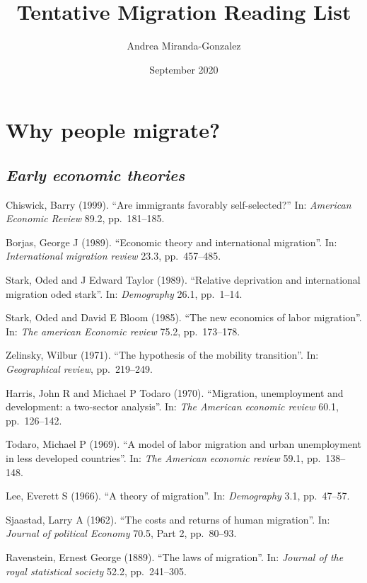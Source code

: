 \documentclass[
  12pt,
]{article}
\title{Tentative Migration Reading List}
\author{Andrea Miranda-Gonzalez}
\date{September 2020}
\begin{document}
\maketitle

{
\setcounter{tocdepth}{2}
\tableofcontents
}
\hypertarget{why-people-migrate}{%
\section{\texorpdfstring{\textbf{Why people
migrate?}}{Why people migrate?}}\label{why-people-migrate}}

\hypertarget{early-economic-theories}{%
\subsection{\texorpdfstring{\emph{Early economic
theories}}{Early economic theories}}\label{early-economic-theories}}

Chiswick, Barry (1999). ``Are immigrants favorably self-selected?'' In:
\emph{American Economic Review} 89.2, pp.~181--185.

Borjas, George J (1989). ``Economic theory and international
migration''. In: \emph{International migration review} 23.3,
pp.~457--485.

Stark, Oded and J Edward Taylor (1989). ``Relative deprivation and
international migration oded stark''. In: \emph{Demography} 26.1,
pp.~1--14.

Stark, Oded and David E Bloom (1985). ``The new economics of labor
migration''. In: \emph{The american Economic review} 75.2, pp.~173--178.

Zelinsky, Wilbur (1971). ``The hypothesis of the mobility transition''.
In: \emph{Geographical review}, pp.~219--249.

Harris, John R and Michael P Todaro (1970). ``Migration, unemployment
and development: a two-sector analysis''. In:
\emph{The American economic review} 60.1, pp.~126--142.

Todaro, Michael P (1969). ``A model of labor migration and urban
unemployment in less developed countries''. In:
\emph{The American economic review} 59.1, pp.~138--148.

Lee, Everett S (1966). ``A theory of migration''. In: \emph{Demography}
3.1, pp.~47--57.

Sjaastad, Larry A (1962). ``The costs and returns of human migration''.
In: \emph{Journal of political Economy} 70.5, Part 2, pp.~80--93.

Ravenstein, Ernest George (1889). ``The laws of migration''. In:
\emph{Journal of the royal statistical society} 52.2, pp.~241--305.
\end{document}
